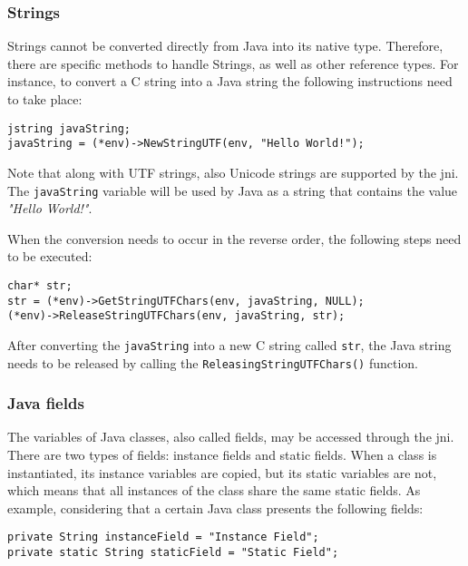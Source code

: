 \subsubsection{Strings}

Strings cannot be converted directly from Java into its native type. Therefore, there are specific methods to handle Strings, as well as other reference types. For instance, to convert a C string into a Java string the following instructions need to take place:

\begin{lstlisting}[caption=Creating a new Java string from a given C string]
jstring javaString;
javaString = (*env)->NewStringUTF(env, "Hello World!");
\end{lstlisting}

Note that along with UTF strings, also Unicode strings are supported by the \gls{jni}. The \texttt{javaString} variable will be used by Java as a string that contains the value \textit{"Hello World!"}.

When the conversion needs to occur in the reverse order, the following steps need to be executed:

\begin{lstlisting}[caption=Creating a new C string from a given Java string]
char* str;
str = (*env)->GetStringUTFChars(env, javaString, NULL);
(*env)->ReleaseStringUTFChars(env, javaString, str);
\end{lstlisting}

After converting the \texttt{javaString} into a new C string called \texttt{str}, the Java string needs to be released by calling the \texttt{ReleasingStringUTFChars()} function.

\subsubsection{Java fields}

The variables of Java classes, also called fields, may be accessed through the \gls{jni}. There are two types of fields: instance fields and static fields. When a class is instantiated, its instance variables are copied, but its static variables are not, which means that all instances of the class share the same static fields. As example, considering that a certain Java class presents the following fields:

\begin{lstlisting}[caption=Declaring Java fields]
private String instanceField = "Instance Field";
private static String staticField = "Static Field";
\end{lstlisting}

